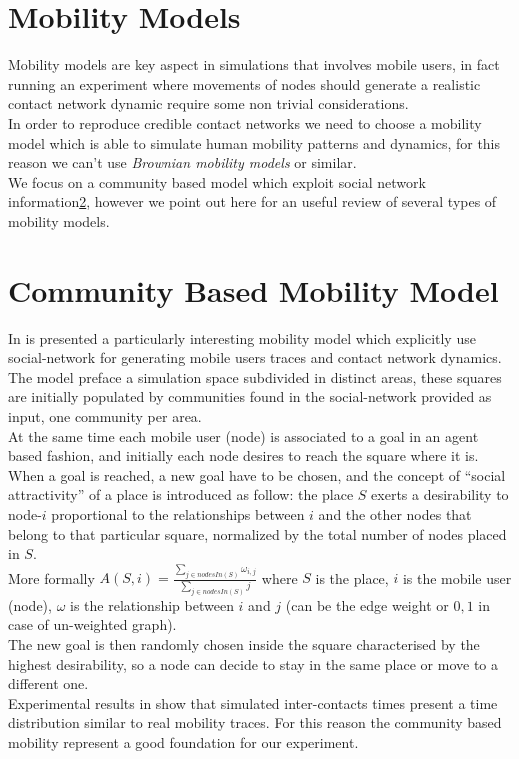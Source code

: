 \section{Mobility Models}
\label{mobility_models}

Mobility models are key aspect in simulations that involves mobile users, in fact running an experiment where movements of nodes should generate a realistic contact network dynamic require some non trivial considerations.\\
In order to reproduce credible contact networks we need to choose a mobility model which is able to simulate human mobility patterns and dynamics, for this reason we can't use \emph{Brownian mobility models} or similar.\\
We focus on a community based model which exploit social network information\ref{mobility_community_based_model}, however we point out here\cite{Camp02asurvey} for an useful review of several types of mobility models.

\section{Community Based Mobility Model}
\label{mobility_community_based_model}

In\cite{Musolesi:2006:CBM:1132983.1132990} is presented a particularly interesting mobility model which explicitly use social-network for generating mobile users traces and contact network dynamics.\\
The model preface a simulation space subdivided in distinct areas, these squares are initially populated by communities found in the social-network provided as input, one community per area.\\
At the same time each mobile user (node) is associated to a goal in an agent based fashion, and initially each node desires to reach the square where it is.\\
When a goal is reached, a new goal have to be chosen, and the concept of ``social attractivity'' of a place is introduced as follow: the place $S$ exerts a desirability to node-$i$ proportional to the relationships between $i$ and the other nodes that belong to that particular square, normalized by the total number of nodes placed in $S$.\\ More formally $ A(S,i) = \frac{ \sum_{j \in nodesIn(S)}{ \omega_{i,j}}  }{ \sum_{j \in nodesIn(S)}{j}  } $ where $S$ is the place, $i$ is the mobile user (node), $\omega$ is the relationship between $i$ and $j$ (can be the edge weight or ${0,1}$ in case of un-weighted graph).\\ The new goal is then randomly chosen inside the square characterised by the highest desirability, so a node can decide to stay in the same place or move to a different one.\\
Experimental results in \cite{Musolesi:2006:CBM:1132983.1132990} show that simulated inter-contacts times present a time distribution similar to real mobility traces. For this reason the community based mobility represent a good foundation for our experiment.

